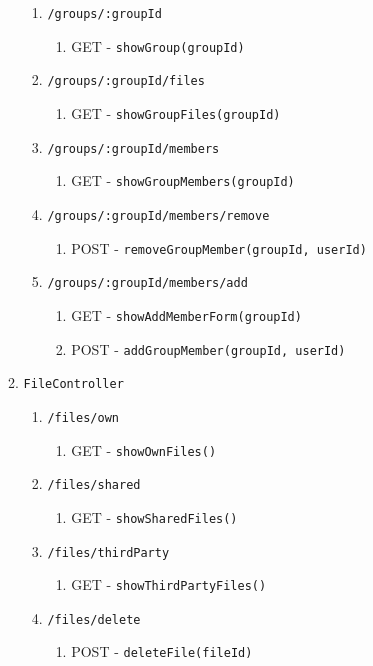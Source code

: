 \documentclass[12pt,DIV14,BCOR10mm,a4paper,parskip=half-,headsepline,headinclude,english,ngerman,bibliography=totocnumbered]{scrreprt}
\begin{document}
\begin{enumerate}
\begin{enumerate}
\begin{enumerate}
      \item \texttt{/groups/:groupId}
      \begin{enumerate}
        \item GET - \texttt{showGroup(groupId)}
      \end{enumerate}
      \item \texttt{/groups/:groupId/files}
      \begin{enumerate}
        \item GET - \texttt{showGroupFiles(groupId)}
      \end{enumerate}
      \item \texttt{/groups/:groupId/members}
      \begin{enumerate}
        \item GET - \texttt{showGroupMembers(groupId)}
      \end{enumerate}
      \item \texttt{/groups/:groupId/members/remove}
      \begin{enumerate}
        \item POST - \texttt{removeGroupMember(groupId, userId)}
      \end{enumerate}
      \item \texttt{/groups/:groupId/members/add}
      \begin{enumerate}
        \item GET - \texttt{showAddMemberForm(groupId)}
        \item POST - \texttt{addGroupMember(groupId, userId)}
      \end{enumerate}
    \end{enumerate}

    \item \texttt{FileController}
    \begin{enumerate}

      \item \texttt{/files/own}
      \begin{enumerate}
        \item GET - \texttt{showOwnFiles()}
      \end{enumerate}
      \item \texttt{/files/shared}
      \begin{enumerate}
        \item GET - \texttt{showSharedFiles()}
      \end{enumerate}
      \item \texttt{/files/thirdParty}
      \begin{enumerate}
        \item GET - \texttt{showThirdPartyFiles()}
      \end{enumerate}
      \item \texttt{/files/delete}
      \begin{enumerate}
        \item POST - \texttt{deleteFile(fileId)}
      \end{enumerate}


\end{enumerate}
\end{enumerate}
\end{enumerate}
\end{document}
